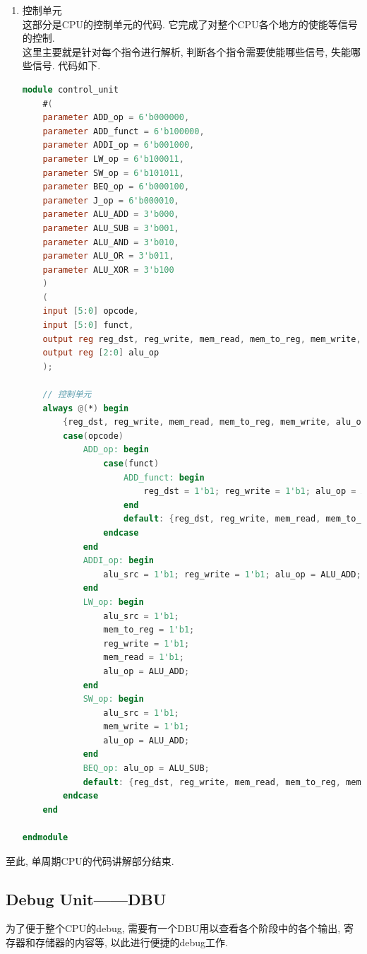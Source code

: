 \documentclass[UTF8]{article}
\begin{document}
\begin{enumerate}
	\item 控制单元\\
	这部分是CPU的控制单元的代码. 它完成了对整个CPU各个地方的使能等信号的控制.\\
	这里主要就是针对每个指令进行解析, 判断各个指令需要使能哪些信号, 失能哪些信号. 代码如下.
	\begin{lstlisting}[language=verilog]
module control_unit
    #(
    parameter ADD_op = 6'b000000,
    parameter ADD_funct = 6'b100000,
    parameter ADDI_op = 6'b001000,
    parameter LW_op = 6'b100011,
    parameter SW_op = 6'b101011,
    parameter BEQ_op = 6'b000100,
    parameter J_op = 6'b000010,
    parameter ALU_ADD = 3'b000,
    parameter ALU_SUB = 3'b001,
    parameter ALU_AND = 3'b010,
    parameter ALU_OR = 3'b011,
    parameter ALU_XOR = 3'b100
    )
    (
    input [5:0] opcode,
    input [5:0] funct,
    output reg reg_dst, reg_write, mem_read, mem_to_reg, mem_write, alu_src,
    output reg [2:0] alu_op
    );
       
    // 控制单元
    always @(*) begin
        {reg_dst, reg_write, mem_read, mem_to_reg, mem_write, alu_op, alu_src} = 9'h0_0000_0000;
        case(opcode)
            ADD_op: begin
                case(funct)
                    ADD_funct: begin
                        reg_dst = 1'b1; reg_write = 1'b1; alu_op = ALU_ADD;
                    end
                    default: {reg_dst, reg_write, mem_read, mem_to_reg, mem_write, alu_op, alu_src} = 9'h0_0000_0000;
                endcase
            end 
            ADDI_op: begin
                alu_src = 1'b1; reg_write = 1'b1; alu_op = ALU_ADD;
            end
            LW_op: begin
                alu_src = 1'b1;
                mem_to_reg = 1'b1;
                reg_write = 1'b1;
                mem_read = 1'b1;
                alu_op = ALU_ADD;
            end
            SW_op: begin
                alu_src = 1'b1;
                mem_write = 1'b1;
                alu_op = ALU_ADD;
            end
            BEQ_op: alu_op = ALU_SUB;
            default: {reg_dst, reg_write, mem_read, mem_to_reg, mem_write, alu_op, alu_src} = 9'h0_0000_0000;
        endcase
    end
    
endmodule
	\end{lstlisting}
\end{enumerate}
至此, 单周期CPU的代码讲解部分结束.

\subsection{Debug Unit——DBU}
为了便于整个CPU的debug, 需要有一个DBU用以查看各个阶段中的各个输出, 寄存器和存储器的内容等, 以此进行便捷的debug工作.
\end{document}
